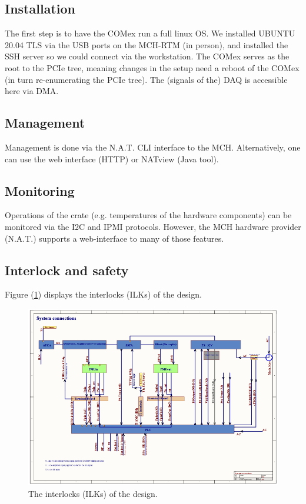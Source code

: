 \documentclass[12pt]{amsart}
\begin{document}
\subsection{Installation}

The first step is to have the COMex run a full linux OS. 
We installed UBUNTU 20.04 TLS via the USB ports on the MCH-RTM (in person), and installed the SSH server so we could connect via the workstation. The COMex serves as the root to the PCIe tree, meaning changes in the setup need a reboot of the COMex (in turn re-enumerating the PCIe tree).
The (signals of the) DAQ is accessible here via DMA. 


\subsection{Management}

Management is done via the N.A.T. CLI interface to the MCH.
Alternatively, one can use the web interface (HTTP) or NATview (Java tool).


\subsection{Monitoring}

Operations of the crate (e.g. temperatures of the hardware components) can be monitored via the I2C and IPMI protocols.
However, the MCH hardware provider (N.A.T.) supports a web-interface to many of those features. 


\subsection{Interlock and safety}

Figure (\ref{fig:ilk}) displays the interlocks (ILKs) of the design. 

\begin{figure}[htbp] %
   \centering
   \includegraphics[width=5in]{im/ILKs.png} 
   \caption{The interlocks (ILKs) of the design.}
   \label{fig:ilk}
\end{figure}
\end{document}

